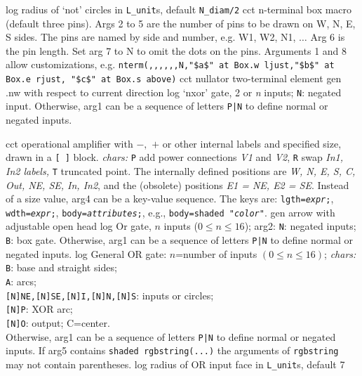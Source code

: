 %
  {log}%
  {radius of `not' circles in {\tt L\_unit}s, default {\tt N\_diam/2}}%
%
  {cct}%
  {n-terminal box macro (default three pins).
   Args 2 to 5 are the number of pins to be drawn on W, N, E, S
   sides.  The pins are named by side and number, e.g. W1, W2, N1,
   $\ldots$ Arg 6 is the pin length.  Set arg 7 to N to omit the
   dots on the pins. Arguments 1 and 8 allow customizations, e.g.
   {\tt nterm(,{,},{,},{,}N,"\$a\$" at Box.w ljust,"\$b\$" at Box.e rjust,
      "\$c\$" at Box.s above)} }%
%
  {cct}%
  { nullator two-terminal element }%
%
  {gen}%
  {.nw with respect to current direction}%
%
  {log}%
  {`nxor' gate, 2 or {\sl n\/} inputs; {\tt N}: negated input.
   Otherwise, arg1 can be a sequence of letters {\tt P|N} to define
   normal or negated inputs.
    }%

%

%
  {cct}%
  {operational amplifier with $-,$ $+$ or other internal labels and
    specified size, drawn in a {\tt [ ]} block.
    {\sl chars:} {\tt P} add power connections {\sl V1} and {\sl V2},
    {\tt R} swap {\sl In1, In2 labels,} {\tt T} truncated point.  The internally
    defined positions are {\sl W, N, E, S, C, Out, NE, SE, In, In2}, and
    the (obsolete) positions {\sl E1 = NE, E2 = SE}. Instead of a size
    value, arg4 can be a key-value sequence.  The keys are:
    {\tt lgth={\sl expr};}, 
    {\tt wdth={\sl expr};}, 
    {\tt body={\sl attributes};}, e.g., {\tt body=shaded "{\sl color}"}. 
   }%
%
  {gen}%
  {arrow with adjustable open head}%
%
  {log}%
  {Or gate, $n$ inputs ($0 \leq n \leq 16$); arg2: {\tt N}: negated inputs;
   {\tt B}: box gate.
   Otherwise, arg1 can be a sequence of letters {\tt P|N} to define
   normal or negated inputs.
    }%
%
  {log}%
  {General OR gate: $n$=number of inputs $(0\leq n\leq 16)$;
    {\sl chars:}%
    {\tt B}: base and straight sides;\\ 
    {\tt A}: arcs;\\
    {\tt [N]NE,[N]SE,[N]I,[N]N,[N]S}: inputs or circles;\\ 
    {\tt [N]P}: XOR arc;\\
    {\tt [N]O}: output; C=center.\\
   Otherwise, arg1 can be a sequence of letters {\tt P|N} to define
   normal or negated inputs.  If arg5 contains {\tt shaded rgbstring(...)}
   the arguments of {\tt rgbstring} may not contain parentheses.}%
%
  {log}%
  {radius of OR input face in {\tt L\_unit}s, default 7}%

